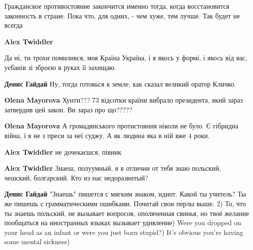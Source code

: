 \begin{itemize}
\begin{itemize}
Гражданское противостояние закончится именно тогда, когда восстановится
законность в стране. Пока что, для одних, - чем хуже, тем лучше. Так будет не
всегда



\textbf{Alex Twiddler} 

Да ні, ти трохи помилився, моя Країна Україна, і я якось
у формі, і якось від вас, уєбанів зі зброєю в руках її захищаю.


\textbf{Денис Гайдай} Ну, тогда готовься к земле, как сказал великий оратор Кличко.


\textbf{Olena Mayorova} Хунти??? 73 відсотки країни вибрало президента, який зараз затвердив цей закон. Ви зараз про що?????


\textbf{Olena Mayorova} А громадянського протистояння ніколи не було. Є гібридна війна, і я не з преси за неї суджу, А як людина яка в ній вже 4 роки.


\textbf{Alex Twiddler} не дочекаєшся, півник


\textbf{Alex Twiddler} Знаеш, полуумный, я в отличии от тебя знаю польский, чешский, болгарский. Кто из нас недоразвитый?


\textbf{Денис Гайдай} "Знаешь" пишется с мягким знаком, идиот. Какой ты учитель? Ты же пишешь с грамматическими ошибками. Почитай свои перлы выше. 2) То, что ты знаешь польский, не вызывает вопросов, ополяченная свинья, но твоё желание пообщаться на иностранных языках вызывает удивление) Were you dropped on your head as an infant or were you just born stupid?) It's obvious you're having some mental sickness)


\end{itemize}
\end{itemize}
